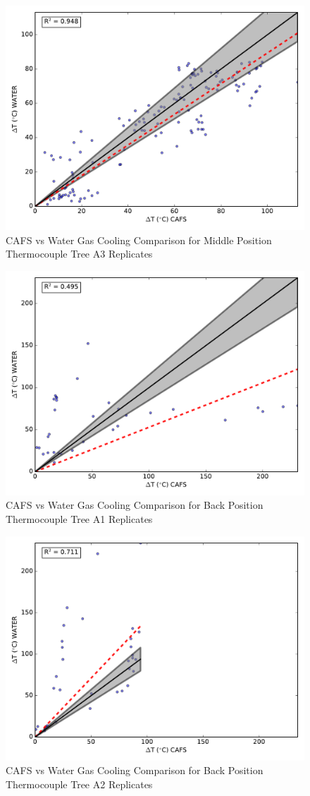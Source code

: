 \documentclass[12pt,oneside]{book}
\begin{document}
\begin{figure}[!ht]
	\includegraphics[width=.7\columnwidth]{../Figures/Gas_Cooling/Combined_mid_A3_scatter}
	\caption{CAFS vs Water Gas Cooling Comparison for Middle Position Thermocouple Tree A3 Replicates}
	\label{fig:CAFS_Water_A3_mid}
\end{figure}


\begin{figure}[!ht]
	\includegraphics[width=.7\columnwidth]{../Figures/Gas_Cooling/Combined_fullback_A1_scatter}
	\caption{CAFS vs Water Gas Cooling Comparison for Back Position Thermocouple Tree A1 Replicates}
	\label{fig:CAFS_Water_A1_back}
\end{figure}

\begin{figure}[!ht]
	\includegraphics[width=.7\columnwidth]{../Figures/Gas_Cooling/Combined_fullback_A2_scatter}
	\caption{CAFS vs Water Gas Cooling Comparison for Back Position Thermocouple Tree A2 Replicates}
	\label{fig:CAFS_Water_A2_back}
\end{figure}
\end{document}
